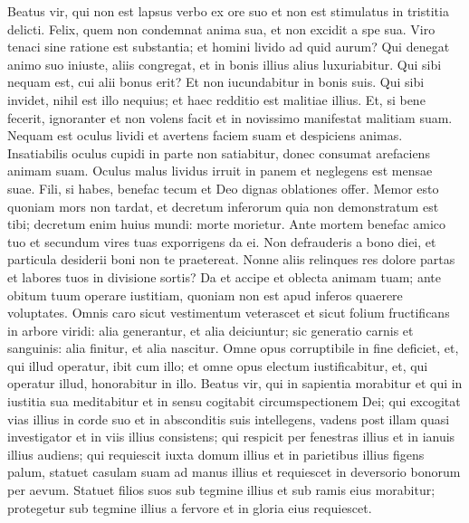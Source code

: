 \begin{biblechapter}
\begin{biblechapter}
\begin{biblechapter}
\begin{biblechapter}
\begin{biblechapter}
\begin{biblechapter}
\begin{biblechapter}
\begin{biblechapter}
\begin{biblechapter}
\begin{biblechapter}
\begin{biblechapter}
\begin{biblechapter}
\begin{biblechapter}
\begin{biblechapter}
\verse Beatus vir, qui non est lapsus verbo ex ore suo
 et non est stimulatus in tristitia delicti.
 \verse Felix, quem non condemnat anima sua,
 et non excidit a spe sua.
 \verse Viro tenaci sine ratione est substantia;
 et homini livido ad quid aurum?
 \verse Qui denegat animo suo iniuste, aliis congregat,
 et in bonis illius alius luxuriabitur.
 \verse Qui sibi nequam est, cui alii bonus erit?
 Et non iucundabitur in bonis suis.
 \verse Qui sibi invidet, nihil est illo nequius;
 et haec redditio est malitiae illius.
 \verse Et, si bene fecerit, ignoranter et non volens facit
 et in novissimo manifestat malitiam suam.
 \verse Nequam est oculus lividi
 et avertens faciem suam et despiciens animas.
 \verse Insatiabilis oculus cupidi in parte non satiabitur,
 donec consumat arefaciens animam suam.
 \verse Oculus malus lividus irruit in panem
 et neglegens est mensae suae.
 \verse Fili, si habes, benefac tecum
 et Deo dignas oblationes offer.
 \verse Memor esto quoniam mors non tardat,
 et decretum inferorum quia non demonstratum est tibi;
 decretum enim huius mundi: morte morietur.
 \verse Ante mortem benefac amico tuo
 et secundum vires tuas exporrigens da ei.
 \verse Non defrauderis a bono diei,
 et particula desiderii boni non te praetereat.
 \verse Nonne aliis relinques res dolore partas
 et labores tuos in divisione sortis?
 \verse Da et accipe et oblecta animam tuam;
 \verse ante obitum tuum operare iustitiam,
 quoniam non est apud inferos quaerere voluptates.
 \verse Omnis caro sicut vestimentum veterascet
 et sicut folium fructificans in arbore viridi:
 alia generantur, et alia deiciuntur;
 \verse sic generatio carnis et sanguinis:
 alia finitur, et alia nascitur.
 \verse Omne opus corruptibile in fine deficiet,
 et, qui illud operatur, ibit cum illo;
 \verse et omne opus electum iustificabitur,
 et, qui operatur illud, honorabitur in illo.
 \verse Beatus vir, qui in sapientia morabitur
 et qui in iustitia sua meditabitur
 et in sensu cogitabit circumspectionem Dei;
 \verse qui excogitat vias illius in corde suo
 et in absconditis suis intellegens,
 vadens post illam quasi investigator
 et in viis illius consistens;
 \verse qui respicit per fenestras illius
 et in ianuis illius audiens;
 \verse qui requiescit iuxta domum illius
 et in parietibus illius figens palum,
 statuet casulam suam ad manus illius
 et requiescet in deversorio bonorum per aevum.
 \verse Statuet filios suos sub tegmine illius
 et sub ramis eius morabitur;
 \verse protegetur sub tegmine illius a fervore
 et in gloria eius requiescet.
 

\end{biblechapter}
\end{biblechapter}
\end{biblechapter}
\end{biblechapter}
\end{biblechapter}
\end{biblechapter}
\end{biblechapter}
\end{biblechapter}
\end{biblechapter}
\end{biblechapter}
\end{biblechapter}
\end{biblechapter}
\end{biblechapter}
\end{biblechapter}
